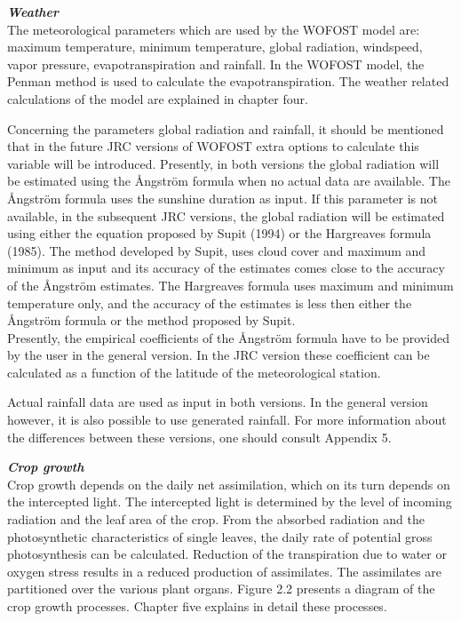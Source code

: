 {\bf {\it Weather\/}}\\
The meteorological parameters which are used by the WOFOST model are: maxi\-mum
temperature, minimum temperature, global radiation, windspeed, vapor pressure,
evapotranspiration and rainfall. In the WOFOST model, the Penman method is used to
calculate the evapotr\-anspiration. The weather related calculations of the model are
explained in chapter four.

\bigskip
Concerning the parameters global radiation and rainfall, it should be mentioned that in the
future JRC versions of WOFOST extra options to calculate this variable will be intro\-duced. Presently, in both versions the global radiation will be estimated using the \AA ngs\-tr\"{o}m formula when no actual data are available. The \AA ngs\-tr\"{o}m formula uses the sunshine
duration as input. If this parame\-ter is not available, in the subsequent JRC versions, the
global radiation will be estimated using either the equation proposed by Supit (1994) or
the Hargre\-aves formula (1985). The method developed by Supit, uses cloud cover and
maximum and minimum as input and its accuracy of the estimates comes close to the
accuracy of the \AA ngs\-tr\"{o}m estimates. The Hargreaves formula uses maximum and
minimum temperature only, and the accuracy of the estimates is less then either the \AA ngs\-tr\"{o}m formula or the method proposed by Supit.\\
Presently, the empirical coefficients of the \AA ngs\-tr\"{o}m formula have to be provided by the
user in the general version. In the JRC version these coefficient can be calculated as a
function of the latitude of the meteorological station.

\bigskip
Actual rainfall data are used as input in both versions. In the general version however, it
is also possible to use generated rainfall. For more informa\-tion about the differences
between these versions, one should consult Appendix 5.

\bigskip
\bigskip
{\bf {\it Crop growth\/}}\\
Crop growth depends on the daily net assimilation, which on its turn depends on the
intercepted light. The intercepted light is determined by the level of incoming radiation
and the leaf area of the crop. From the absorbed radiation and the photosynthetic
characteristics of single leaves, the daily rate of potential gross photosynthesis can be
calculated. Reduction of the transpiration due to water or oxygen stress results in a
reduced production of assimilates. The assimilates are partitioned over the various plant
organs. Figure 2.2 presents a diagram of the crop growth processes. Chapter five explains
in detail these processes.

